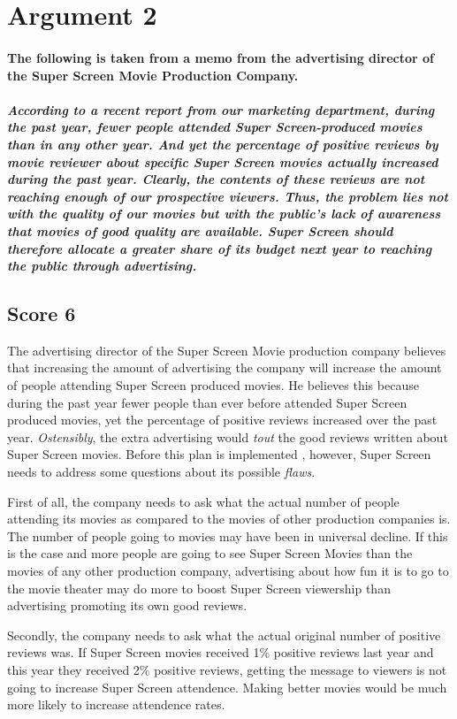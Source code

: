 \section{Argument 2}

\paragraph{The following is taken from a memo from the advertising director of the Super Screen Movie Production Company.}
\subparagraph{According to a recent report from our marketing department, during the past year, fewer people attended Super Screen-produced movies than in any other year.
And yet the percentage of positive reviews by movie reviewer about specific Super Screen movies actually increased during the past year.
Clearly, the contents of these reviews are not reaching enough of our prospective viewers.
Thus, the problem lies not with the quality of our movies but with the public's lack of awareness that movies of good quality are available.
Super Screen should therefore allocate a greater share of its budget next year to reaching the public through advertising.}

\subsection{Score 6}
The advertising director of the Super Screen Movie production company believes that increasing the amount of advertising the company will increase the amount of people attending Super Screen produced movies.
He believes this because during the past year fewer people than ever before attended Super Screen produced movies, yet the percentage of positive reviews increased over the past year.
\emph{Ostensibly}, the extra advertising would \emph{tout} the good reviews written about Super Screen movies.
Before this plan is implemented , however, Super Screen needs to address some questions about its possible \emph{flaws}.

First of all, the company needs to ask what the actual number of people attending its movies as compared to the movies of other production companies is.
The number of people going to movies may have been in universal decline.
If this is the case and more people are going to see Super Screen Movies than the movies of any other production company, advertising about how fun it is to go to the movie theater may do more to boost Super Screen viewership than advertising promoting its own good reviews.

Secondly, the company needs to ask what the actual original number of positive reviews was.
If Super Screen movies received 1\% positive reviews last year and this year they received 2\% positive reviews, getting the message to viewers is not going to increase Super Screen attendence.
Making better movies would be much more likely to increase attendence rates.

